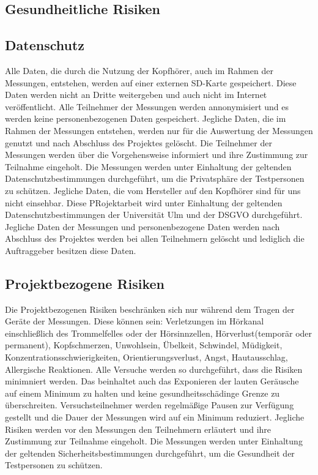 \documentclass{article}
\begin{document}
    \subsection{Gesundheitliche Risiken}

    \subsection{Datenschutz}
    Alle Daten, die durch die Nutzung der Kopfhörer, auch im Rahmen der Messungen, entstehen, werden auf einer externen SD-Karte gespeichert. 
    Diese Daten werden nicht an Dritte weitergeben und auch nicht im Internet veröffentlicht.
    Alle Teilnehmer der Messungen werden annonymisiert und es werden keine personenbezogenen Daten gespeichert. 
    Jegliche Daten, die im Rahmen der Messungen entstehen, werden nur für die Auswertung der Messungen genutzt und nach Abschluss des Projektes gelöscht.
    Die Teilnehmer der Messungen werden über die Vorgehensweise informiert und ihre Zustimmung zur Teilnahme eingeholt. 
    Die Messungen werden unter Einhaltung der geltenden Datenschutzbestimmungen durchgeführt, um die Privatsphäre der Testpersonen zu schützen.
    Jegliche Daten, die vom Hersteller auf den Kopfhörer sind für uns nicht einsehbar.
    Diese PRojektarbeit wird unter Einhaltung der geltenden Datenschutzbestimmungen der Universität Ulm und der DSGVO durchgeführt. Jegliche Daten der Messungen und personenbezogene Daten werden nach Abschluss des Projektes werden bei allen Teilnehmern gelöscht und lediglich die Auftraggeber besitzen diese Daten.

    \subsection{Projektbezogene Risiken}
    Die Projektbezogenen Risiken beschränken sich nur während dem Tragen der Geräte der Messungen. Diese können sein: Verletzungen im Hörkanal einschließlich des Trommelfelles oder der Hörsinnzellen, Hörverlust(temporär oder permanent), Kopfschmerzen, Unwohlsein, Übelkeit, Schwindel, Müdigkeit, Konzentrationsschwierigkeiten, Orientierungsverlust, Angst, Hautausschlag, Allergische Reaktionen.
    Alle Versuche werden so durchgeführt, dass die Risiken minimniert werden. Das beinhaltet auch das Exponieren der lauten Geräusche auf einem Minimum zu halten und keine gesundheitsschädinge Grenze zu überschreiten. 
    Versuchsteilnehmer werden regelmäßige Pausen zur Verfügung gestellt und die Dauer der Messungen wird auf ein Minimum reduziert. Jegliche Risiken werden vor den Messungen den Teilnehmern erläutert und ihre Zustimmung zur Teilnahme eingeholt. Die Messungen werden unter Einhaltung der geltenden Sicherheitsbestimmungen durchgeführt, um die Gesundheit der Testpersonen zu schützen. 
\end{document}
